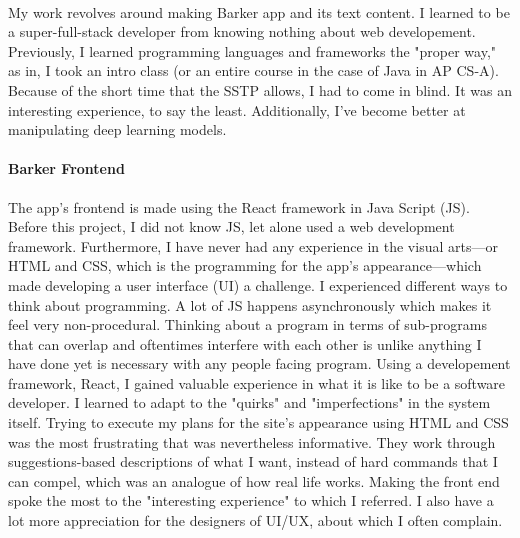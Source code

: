 \documentclass[12pt, letterpaper]{article}
\begin{document}
\paragraph{}My work revolves around making Barker app and its text content. I learned to be a super-full-stack developer from knowing nothing about web developement. Previously, I learned programming languages and frameworks the "proper way," as in, I took an intro class (or an entire course in the case of Java in AP CS-A). Because of the short time that the SSTP allows, I had to come in blind. It was an interesting experience, to say the least. Additionally, I've become better at manipulating deep learning models. 

\paragraph{Barker Frontend}The app's frontend is made using the React framework in Java Script (JS). Before this project, I did not know JS, let alone used a web development framework. Furthermore, I have never had any experience in the visual arts---or HTML and CSS, which is the programming for the app's appearance---which made developing a user interface (UI) a challenge. I experienced different ways to think about programming. A lot of JS happens asynchronously which makes it feel very non-procedural. Thinking about a program in terms of sub-programs that can overlap and oftentimes interfere with each other is unlike anything I have done yet is necessary with any people facing program. Using a developement framework, React, I gained valuable experience in what it is like to be a software developer. I learned to adapt to the "quirks" and "imperfections" in the system itself. Trying to execute my plans for the site's appearance using HTML and CSS was the most frustrating that was nevertheless informative. They work through suggestions-based descriptions of what I want, instead of hard commands that I can compel, which was an analogue of how real life works. Making the front end spoke the most to the "interesting experience" to which I referred. I also have a lot more appreciation for the designers of UI/UX, about which I often complain.
\end{document}
